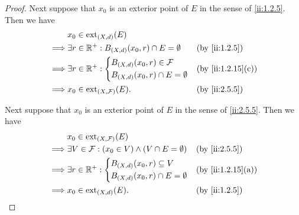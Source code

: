 \begin{proof}
  Next suppose that \(x_0\) is an exterior point of \(E\) in the sense of \cref{ii:1.2.5}.
  Then we have
  \begin{align*}
             & x_0 \in \text{ext}_{(X, d)}(E)                                             \\
    \implies & \exists r \in \R^+ : B_{(X, d)}(x_0, r) \cap E = \emptyset &  & \by{ii:1.2.5} \\
    \implies & \exists r \in \R^+ : \begin{dcases}
                                      B_{(X, d)}(x_0, r) \in \mathcal{F} \\
                                      B_{(X, d)}(x_0, r) \cap E = \emptyset
                                    \end{dcases}                      &  & \by{ii:1.2.15}[c] \\
    \implies & x_0 \in \text{ext}_{(X, \mathcal{F})}(E).                  &  & \by{ii:2.5.5}
  \end{align*}

  Next suppose that \(x_0\) is an exterior point of \(E\) in the sense of \cref{ii:2.5.5}.
  Then we have
  \begin{align*}
             & x_0 \in \text{ext}_{(X, \mathcal{F})}(E)                                             \\
    \implies & \exists V \in \mathcal{F} : (x_0 \in V) \land (V \cap E = \emptyset) &  & \by{ii:2.5.5} \\
    \implies & \exists r \in \R^+ : \begin{dcases}
                                      B_{(X, d)}(x_0, r) \subseteq V \\
                                      B_{(X, d)}(x_0, r) \cap E = \emptyset
                                    \end{dcases}                                &  & \by{ii:1.2.15}[a] \\
    \implies & x_0 \in \text{ext}_{(X, d)}(E).                                      &  & \by{ii:1.2.5}
  \end{align*}


\end{proof}
